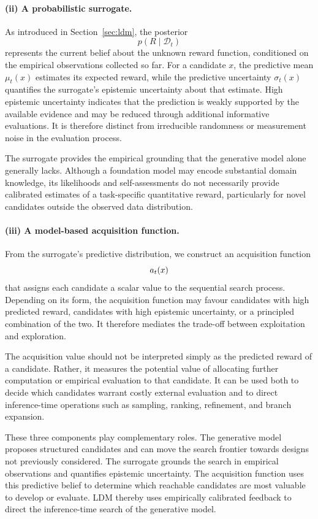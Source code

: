 \paragraph{(ii) A probabilistic surrogate.}
As introduced in Section~\ref{sec:ldm}, the posterior
\[
    p(R\mid\mathcal{D}_t)
\]
represents the current belief about the unknown reward function, conditioned
on the empirical observations collected so far. For a candidate $x$, the
predictive mean $\mu_t(x)$ estimates its expected reward, while the predictive
uncertainty $\sigma_t(x)$ quantifies the surrogate's epistemic uncertainty
about that estimate. High epistemic uncertainty indicates that the prediction
is weakly supported by the available evidence and may be reduced through
additional informative evaluations. It is therefore distinct from
irreducible randomness or measurement noise in the evaluation process.

The surrogate provides the empirical grounding that the generative model
alone generally lacks. Although a foundation model may encode substantial
domain knowledge, its likelihoods and self-assessments do not necessarily
provide calibrated estimates of a task-specific quantitative reward,
particularly for novel candidates outside the observed data distribution.

\paragraph{(iii) A model-based acquisition function.}
From the surrogate's predictive distribution, we construct an acquisition
function
\[
    a_t(x)
\]
that assigns each candidate a scalar value to the sequential search process.
Depending on its form, the acquisition function may favour candidates with
high predicted reward, candidates with high epistemic uncertainty, or a
principled combination of the two. It therefore mediates the trade-off between
exploitation and exploration.

The acquisition value should not be interpreted simply as the predicted
reward of a candidate. Rather, it measures the potential value of allocating
further computation or empirical evaluation to that candidate. It can be used
both to decide which candidates warrant costly external evaluation and to
direct inference-time operations such as sampling, ranking, refinement, and
branch expansion.

These three components play complementary roles. The generative model proposes
structured candidates and can move the search frontier towards designs not
previously considered. The surrogate grounds the search in empirical
observations and quantifies epistemic uncertainty. The acquisition function
uses this predictive belief to determine which reachable candidates are most
valuable to develop or evaluate. LDM thereby uses empirically calibrated
feedback to direct the inference-time search of the generative model.

